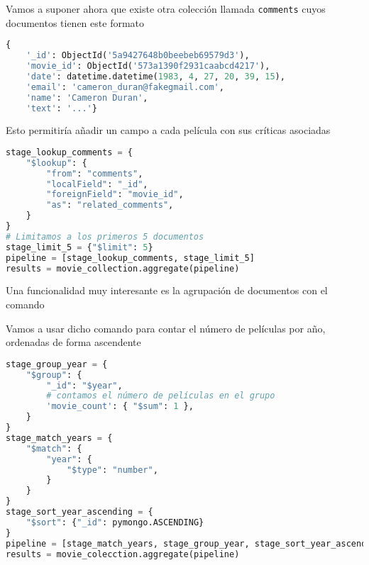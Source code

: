 \Ej

Vamos a suponer ahora que existe otra colección llamada \texttt{comments} cuyos documentos tienen este formato
\begin{lstlisting}[language=python]
{
	'_id': ObjectId('5a9427648b0beebeb69579d3'),
	'movie_id': ObjectId('573a1390f2931caabcd4217'),
	'date': datetime.datetime(1983, 4, 27, 20, 39, 15),
	'email': 'cameron_duran@fakegmail.com',
	'name': 'Cameron Duran',
	'text': '...'}
\end{lstlisting}

Esto permitiría añadir un campo  a cada película con sus críticas asociadas

\begin{lstlisting}[language=python]
stage_lookup_comments = {
	"$lookup": {
		"from": "comments",
		"localField": "_id",
		"foreignField": "movie_id",
		"as": "related_comments",	
	}
}
# Limitamos a los primeros 5 documentos
stage_limit_5 = {"$limit": 5}
pipeline = [stage_lookup_comments, stage_limit_5]
results = movie_collection.aggregate(pipeline)
\end{lstlisting}

\Ej

Una funcionalidad muy interesante es la agrupación de documentos con el comando 

Vamos a usar dicho comando para contar el número de películas por año, ordenadas de forma ascendente

\begin{lstlisting}[language=python]
stage_group_year = {
	"$group": {
		"_id": "$year",
		# contamos el número de películas en el grupo
		'movie_count': { "$sum": 1 },
	}
}
stage_match_years = {
	"$match": {
		"year": {
			"$type": "number",
		}
	}
}
stage_sort_year_ascending = {
	"$sort": {"_id": pymongo.ASCENDING}
}
pipeline = [stage_match_years, stage_group_year, stage_sort_year_ascending]
results = movie_colecction.aggregate(pipeline)
\end{lstlisting}
